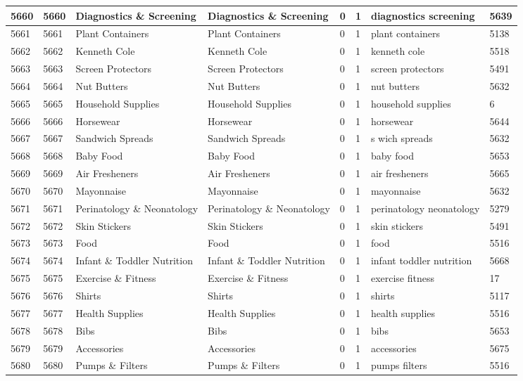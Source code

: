 \begin{longtable}{|l|l|l|l|l|l|l|l|}
5660 & 5660 & Diagnostics \& Screening & Diagnostics \& Screening & 0 & 1 & diagnostics screening & 5639 \\ \hline 
5661 & 5661 & Plant Containers & Plant Containers & 0 & 1 & plant containers & 5138 \\ \hline 
5662 & 5662 & Kenneth Cole & Kenneth Cole & 0 & 1 & kenneth cole & 5518 \\ \hline 
5663 & 5663 & Screen Protectors & Screen Protectors & 0 & 1 & screen protectors & 5491 \\ \hline 
5664 & 5664 & Nut Butters & Nut Butters & 0 & 1 & nut butters & 5632 \\ \hline 
5665 & 5665 & Household Supplies & Household Supplies & 0 & 1 & household supplies & 6 \\ \hline 
5666 & 5666 & Horsewear & Horsewear & 0 & 1 & horsewear & 5644 \\ \hline 
5667 & 5667 & Sandwich Spreads & Sandwich Spreads & 0 & 1 & s wich spreads & 5632 \\ \hline 
5668 & 5668 & Baby Food & Baby Food & 0 & 1 & baby food & 5653 \\ \hline 
5669 & 5669 & Air Fresheners & Air Fresheners & 0 & 1 & air fresheners & 5665 \\ \hline 
5670 & 5670 & Mayonnaise & Mayonnaise & 0 & 1 & mayonnaise & 5632 \\ \hline 
5671 & 5671 & Perinatology \& Neonatology & Perinatology \& Neonatology & 0 & 1 & perinatology neonatology & 5279 \\ \hline 
5672 & 5672 & Skin Stickers & Skin Stickers & 0 & 1 & skin stickers & 5491 \\ \hline 
5673 & 5673 & Food & Food & 0 & 1 & food & 5516 \\ \hline 
5674 & 5674 & Infant \& Toddler Nutrition & Infant \& Toddler Nutrition & 0 & 1 & infant toddler nutrition & 5668 \\ \hline 
5675 & 5675 & Exercise \& Fitness & Exercise \& Fitness & 0 & 1 & exercise fitness & 17 \\ \hline 
5676 & 5676 & Shirts & Shirts & 0 & 1 & shirts & 5117 \\ \hline 
5677 & 5677 & Health Supplies & Health Supplies & 0 & 1 & health supplies & 5516 \\ \hline 
5678 & 5678 & Bibs & Bibs & 0 & 1 & bibs & 5653 \\ \hline 
5679 & 5679 & Accessories & Accessories & 0 & 1 & accessories & 5675 \\ \hline 
5680 & 5680 & Pumps \& Filters & Pumps \& Filters & 0 & 1 & pumps filters & 5516 \\ \hline 

\end{longtable}
